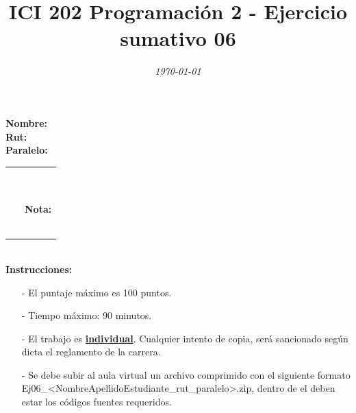 \documentclass{exam}
\title{\LARGE\color{azul}\textbf{ICI 202 Programaci\'on 2 - Ejercicio sumativo 06 }}
\author{\normalsize \color{gray}{Prof.} \color{black}{\textbf{Ismael Figueroa, Eduardo Godoy}}}
\date{\normalsize \em \today}
\begin{document}

\maketitle

\begin{multicols}{2} \begin{flushleft} \textbf{Nombre:} \\ \vspace*{2mm} \textbf{Rut:} \\ \vspace*{2mm} \textbf{Paralelo:} \end{flushleft} \begin{center} \begin{table}[H] \begin{tabular}{p{4cm}|p{3cm}|} \arrayrulecolor{gray!50}\cline{2-2} ~ & {\em {\scriptsize \color{gray!50}{Puntaje:}}} \\ & ~ \\ ~ & \textbf{Nota:} \\ & ~ \\ \arrayrulecolor{gray!50}\cline{2-2} \end{tabular} \end{table} \end{center} \end{multicols}

\vspace*{-18mm}
\noindent
\textbf{\\Instrucciones:}
\begin{itemize}
    \item[-] El puntaje m\'aximo  es 100 puntos.
    \item[-] Tiempo m\'aximo: 90 minutos.
    \item[-] El trabajo es \underline{\textbf{individual}}. Cualquier intento de copia, ser\'a sancionado seg\'un dicta el reglamento de la carrera.
    \item[-] Se debe subir al aula virtual un archivo comprimido con el siguiente formato \\ Ej06\_<NombreApellidoEstudiante\_rut\_paralelo>.zip, dentro de el deben estar los c\'odigos fuentes requeridos.
\end{itemize}
\end{document}
